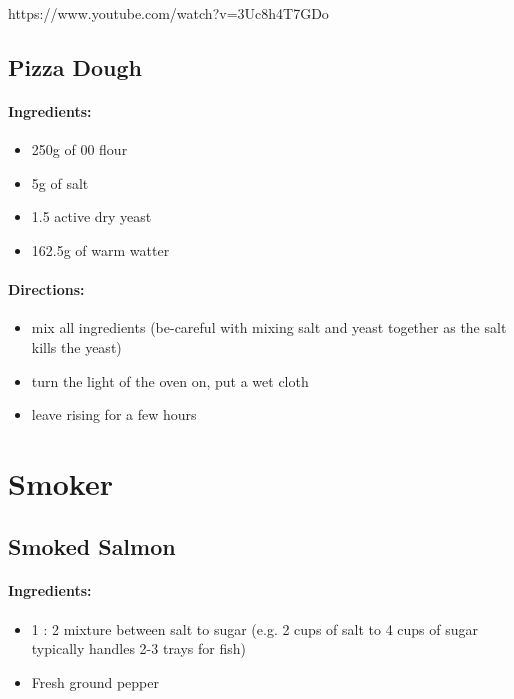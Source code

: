 \documentclass{article}
\begin{document}
https://www.youtube.com/watch?v=3Uc8h4T7GDo

\subsection{Pizza Dough}


\paragraph{Ingredients:}

\begin{itemize}
	\item 250g of 00 flour
	\item 5g of salt
	\item 1.5 active dry yeast
	\item 162.5g of warm watter
\end{itemize}


\paragraph{Directions:}
\begin{itemize}
	\item mix all ingredients (be-careful with mixing salt and yeast together as the salt kills the yeast)
	\item turn the light of the oven on, put a wet cloth
	\item leave rising for a few hours
\end{itemize}

\section{Smoker}

\subsection{Smoked Salmon}{}

\paragraph{Ingredients:}

\begin{itemize}
	\item 1 : 2 mixture between salt to sugar (e.g. 2 cups of salt to 4 cups of sugar typically handles 2-3 trays for fish)
	\item Fresh ground pepper
\end{itemize}
\end{document}
